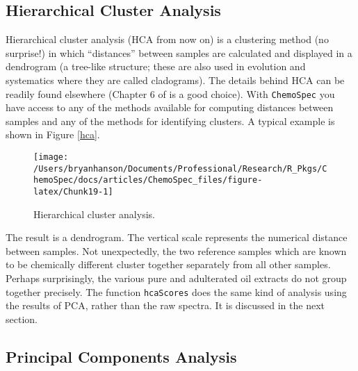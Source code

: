 \documentclass[letter,10pt,twocolumn,twoside,printwatermark=false]{pinp}
\begin{document}
\hypertarget{hierarchical-cluster-analysis}{%
\subsection{Hierarchical Cluster
Analysis}\label{hierarchical-cluster-analysis}}

\label{sec-hca} Hierarchical cluster analysis (HCA from now on) is a
clustering method (no surprise!) in which ``distances'' between samples
are calculated and displayed in a dendrogram (a tree-like structure;
these are also used in evolution and systematics where they are called
cladograms). The details behind HCA can be readily found elsewhere
(Chapter 6 of \cite{Filzmoser2009} is a good choice). With
\texttt{ChemoSpec} you have access to any of the methods available for
computing distances between samples and any of the methods for
identifying clusters. A typical example is shown in Figure \ref{hca}.

\begin{Shaded}
\begin{Highlighting}[]
\StringTok{ }
\end{Highlighting}
\end{Shaded}

\begin{figure}

{\centering \texttt{[image: /Users/bryanhanson/Documents/Professional/Research/R\_Pkgs/ChemoSpec/docs/articles/ChemoSpec\_files/figure-latex/Chunk19-1]} 

}

\caption{\label{hca}Hierarchical cluster analysis.}\label{fig:Chunk19}
\end{figure}

The result is a dendrogram. The vertical scale represents the numerical
distance between samples. Not unexpectedly, the two reference samples
which are known to be chemically different cluster together separately
from all other samples. Perhaps surprisingly, the various pure and
adulterated oil extracts do not group together precisely. The function
\texttt{hcaScores} does the same kind of analysis using the results of
PCA, rather than the raw spectra. It is discussed in the next section.

\hypertarget{principal-components-analysis}{%
\subsection{Principal Components
Analysis}\label{principal-components-analysis}}
\end{document}
